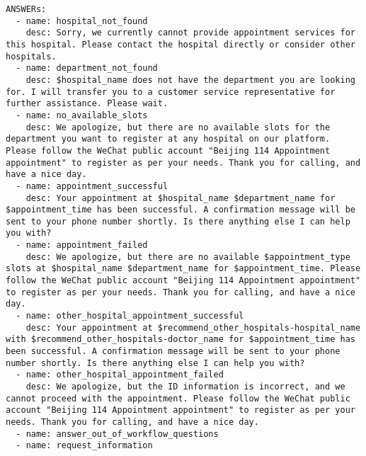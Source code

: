 \begin{envnew}
\begin{lstlisting}[language={}, caption=Example of PDL]
ANSWERs:
  - name: hospital_not_found
    desc: Sorry, we currently cannot provide appointment services for this hospital. Please contact the hospital directly or consider other hospitals.
  - name: department_not_found
    desc: $hospital_name does not have the department you are looking for. I will transfer you to a customer service representative for further assistance. Please wait.
  - name: no_available_slots
    desc: We apologize, but there are no available slots for the department you want to register at any hospital on our platform. Please follow the WeChat public account "Beijing 114 Appointment appointment" to register as per your needs. Thank you for calling, and have a nice day.
  - name: appointment_successful
    desc: Your appointment at $hospital_name $department_name for $appointment_time has been successful. A confirmation message will be sent to your phone number shortly. Is there anything else I can help you with?
  - name: appointment_failed
    desc: We apologize, but there are no available $appointment_type slots at $hospital_name $department_name for $appointment_time. Please follow the WeChat public account "Beijing 114 Appointment appointment" to register as per your needs. Thank you for calling, and have a nice day.
  - name: other_hospital_appointment_successful
    desc: Your appointment at $recommend_other_hospitals-hospital_name with $recommend_other_hospitals-doctor_name for $appointment_time has been successful. A confirmation message will be sent to your phone number shortly. Is there anything else I can help you with?
  - name: other_hospital_appointment_failed
    desc: We apologize, but the ID information is incorrect, and we cannot proceed with the appointment. Please follow the WeChat public account "Beijing 114 Appointment appointment" to register as per your needs. Thank you for calling, and have a nice day.
  - name: answer_out_of_workflow_questions
  - name: request_information


\end{lstlisting}
\end{envnew}
